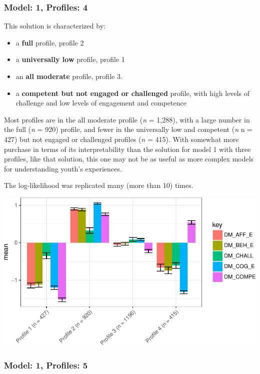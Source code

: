 \documentclass[]{msu-thesis}
\providecommand{\tightlist}{%
  \setlength{\itemsep}{0pt}\setlength{\parskip}{0pt}}
\theoremstyle{definition}
\theoremstyle{definition}
\theoremstyle{definition}
\theoremstyle{remark}
\begin{document}
\subsubsection{Model: 1, Profiles: 4}\label{model-1-profiles-4}

This solution is characterized by:

\begin{itemize}
\tightlist
\item
  a \textbf{full} profile, profile 2
\item
  a \textbf{universally low} profile, profile 1
\item
  an \textbf{all moderate} profile, profile 3.
\item
  a \textbf{competent but not engaged or challenged} profile, with high
  levels of challenge and low levels of engagement and competence
\end{itemize}

Most profiles are in the all moderate profile (\emph{n} = 1,288), with a
large number in the full (\emph{n} = 920) profile, and fewer in the
universally low and competent (\emph{n} n = 427) but not engaged or
challenged profiles (\emph{n} = 415). With somewhat more purchase in
terms of its interpretability than the solution for model 1 with three
profiles, like that solution, this one may not be as useful as more
complex models for understanding youth's experiences.

The log-likelihood was replicated many (more than 10) times.

\begin{center}\includegraphics[width=0.8\linewidth]{rosenberg-dissertation_files/figure-latex/m1_4p-1} \end{center}

\subsubsection{Model: 1, Profiles: 5}\label{model-1-profiles-5}
\end{document}
